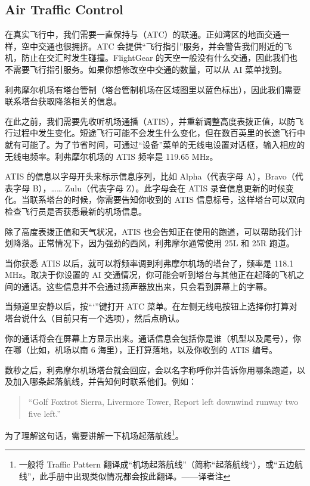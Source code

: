 \subsection{Air Traffic Control}

在真实飞行中，我们需要一直保持与（ATC）的联通。正如湾区的地面交通一样，空中交通也很拥挤。ATC 会提供“飞行指引”服务，并会警告我们附近的飞机，防止在交汇时发生碰撞。FlightGear 的天空一般没有什么交通，因此我们也不需要飞行指引服务。如果你想修改空中交通的数量，可以从 AI 菜单找到。

利弗摩尔机场有塔台管制（塔台管制机场在区域图里以蓝色标出），因此我们需要联系塔台获取降落相关的信息。

在此之前，我们需要先收听机场通播（ATIS），并重新调整高度表拨正值，以防飞行过程中发生变化。短途飞行可能不会发生什么变化，但在数百英里的长途飞行中就有可能了。为了节省时间，可通过“设备”菜单的无线电设置对话框，输入相应的无线电频率。利弗摩尔机场的 ATIS 频率是 119.65 MHz。

ATIS 的信息以字母开头来标示信息序列，比如 Alpha（代表字母 A），Bravo（代表字母 B），…… Zulu（代表字母 Z）。此字母会在 ATIS 录音信息更新的时候变化。当联系塔台的时候，你需要告知你收到的 ATIS 信息标号，这样塔台可以双向检查飞行员是否获悉最新的机场信息。

除了高度表拨正值和天气状况，ATIS 也会告知正在使用的跑道，可以帮助我们计划降落。正常情况下，因为强劲的西风，利弗摩尔通常使用 25L 和 25R 跑道。

当你获悉 ATIS 以后，就可以将频率调到利弗摩尔机场的塔台了，频率是 118.1 MHz。取决于你设置的 AI 交通情况，你可能会听到塔台与其他正在起降的飞机之间的通话。这些信息并不会通过扬声器放出来，只会看到屏幕上的字幕。

当频道里安静以后，按“`”键打开 ATC 菜单。在左侧无线电按钮上选择你打算对塔台说什么（目前只有一个选项），然后点确认。

你的通话将会在屏幕上方显示出来。通话信息会包括你是谁（机型以及尾号），你在哪（比如，机场以南 6 海里），正打算落地，以及你收到的 ATIS 编号。

数秒之后，利弗摩尔机场塔台就会回应，会以名字称呼你并告诉你用哪条跑道，以及加入哪条起落航线，并告知何时联系他们。例如：

\begin{quote}
``Golf Foxtrot Sierra, Livermore Tower, Report left downwind runway two five left.''
\end{quote}

为了理解这句话，需要讲解一下机场起落航线\footnote{一般将 Traffic Pattern 翻译成“机场起落航线”（简称“起落航线“），或“五边航线”，此手册中出现类似情况都会按此翻译。——译者注}。

